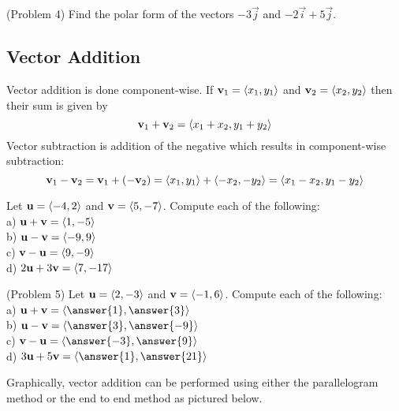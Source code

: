 \documentclass[handout]{ximera}
\begin{document}
\begin{problem}(Problem 4)
Find the polar form of the vectors $-3\vec{j}$ and $-2\vec{i}+5\vec{j}$.\\
\end{problem}

\subsection{Vector Addition}
Vector addition is done component-wise.  If $\mathbf{v}_1 = \left\langle x_1, y_1\right\rangle$ and $\mathbf{v}_2 = \left\langle x_2, y_2\right\rangle$
then their sum is given by
\[
\mathbf{v}_1+ \mathbf{v}_2= \left\langle x_1+x_2,  y_1+y_2\right\rangle
\]
Vector subtraction is addition of the negative which results in component-wise subtraction:
\[
\mathbf{v}_1- \mathbf{v}_2= \mathbf{v}_1+ \left(- \mathbf{v}_2\right)  = \left\langle x_1,y_1\right\rangle + \left\langle -x_2, -y_2\right\rangle = \left\langle x_1-x_2,  y_1-y_2\right\rangle
\]

\begin{example}[Example 5]
Let $\mathbf{u} = \left\langle -4, 2\right\rangle$ and $\mathbf{v} = \left\langle 5, -7\right\rangle$.  Compute each of the following:\\
a) $\mathbf{u}+\mathbf{v} = \left\langle 1, -5\right\rangle$\\
b) $\mathbf{u}-\mathbf{v} = \left\langle -9, 9\right\rangle$\\
c) $\mathbf{v}-\mathbf{u} = \left\langle 9, -9\right\rangle$\\
d) $2\mathbf{u}+3\mathbf{v} = \left\langle 7, -17\right\rangle$\\
\end{example}

\begin{problem}(Problem 5)
Let $\mathbf{u} = \left\langle 2, -3\right\rangle$ and $\mathbf{v} = \left\langle -1, 6\right\rangle$.  Compute each of the following:\\
a) $\vec{u}+\vec{v} = \vector{\answer{1}, \answer{3}}$\\
b) $\vec{u}-\vec{v} = \vector{\answer{3}, \answer{-9}}$\\
c) $\vec{v}-\vec{u} = \vector{\answer{-3}, \answer{9}}$\\
d) $3\vec{u}+5\vec{v} = \vector{\answer{1}, \answer{21}}$\\
\end{problem}

Graphically, vector addition can be performed using either the parallelogram method or the end to end method as pictured below.
\begin{image}
\end{image}
\end{document}
